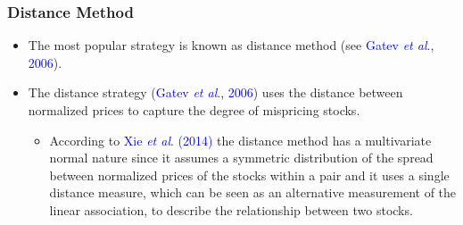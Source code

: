 \documentclass[pdf,9pt,xcolor=dvipsnames,hide notes]{beamer}
\begin{document}
\begin{frame}[label=frame1]
\frametitle{Distance Method}

\begin{itemize}
	\justifying
			
			\item The most popular strategy is known as distance method (see \textcolor{blue}{Gatev \emph{et al}}., \textcolor{blue}{2006}). 
			
		    \vspace{0.3cm}
			
			\item The distance strategy (\textcolor{blue}{Gatev \emph{et al}}., \textcolor{blue}{2006}) uses the distance between normalized prices to capture the degree of mispricing stocks. 
		
			\vspace{0.1cm}
			
			\begin{itemize}
				\item According to \textcolor{blue}{Xie \emph{et al}}. \textcolor{blue}{(2014)} the distance method has a multivariate normal nature since it assumes a symmetric distribution of the spread between normalized prices of the stocks within a pair and it uses a single distance measure, which can be seen as an alternative measurement of the linear association, to describe the relationship between two stocks.
			\end{itemize}
			
		\end{itemize}	
	\end{frame}
\end{document}
